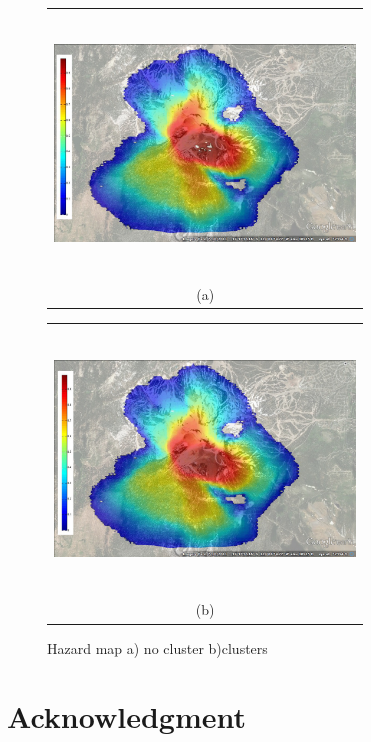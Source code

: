 \documentclass[12pt,letterpaper]{article}
\begin{document}
\begin{figure}[H]
  \begin{minipage}[b]{0.5\textwidth}
    \begin{tabular}{c}
      \includegraphics[width=8cm,height=7cm,keepaspectratio]{figs/hazard_map_noclusters.jpg}\\
      (a)
    \end{tabular}
  \end{minipage}
  \begin{minipage}{0.5\textwidth}
    \begin{tabular}{c}
      \includegraphics[width=8cm,height=7cm,keepaspectratio]{figs/hazard_map_clusters.jpg}\\
      (b)
    \end{tabular}
  \end{minipage}
  \caption{Hazard map a) no cluster b)clusters}\label{fig:fig5}
\end{figure}


\section*{Acknowledgment}
 
\end{document}
